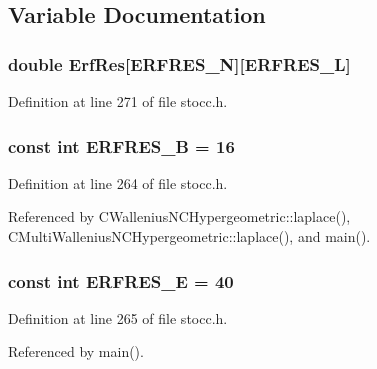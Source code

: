 \subsection{Variable Documentation}
\subsubsection[{Erf\-Res}]{\setlength{\rightskip}{0pt plus 5cm}double Erf\-Res[{\bf E\-R\-F\-R\-E\-S\-\_\-\-N}][{\bf E\-R\-F\-R\-E\-S\-\_\-\-L}]}\label{rnd_2stocc_8h_a532e3be570cd6f91d0e35bf278570579}


Definition at line 271 of file stocc.\-h.

\subsubsection[{E\-R\-F\-R\-E\-S\-\_\-\-B}]{\setlength{\rightskip}{0pt plus 5cm}const int E\-R\-F\-R\-E\-S\-\_\-\-B = 16\hspace{0.3cm}{\ttfamily [static]}}\label{rnd_2stocc_8h_aa889b5bc8e66f3c0ab1f4913b1cf084e}


Definition at line 264 of file stocc.\-h.



Referenced by C\-Wallenius\-N\-C\-Hypergeometric\-::laplace(), C\-Multi\-Wallenius\-N\-C\-Hypergeometric\-::laplace(), and main().

\subsubsection[{E\-R\-F\-R\-E\-S\-\_\-\-E}]{\setlength{\rightskip}{0pt plus 5cm}const int E\-R\-F\-R\-E\-S\-\_\-\-E = 40\hspace{0.3cm}{\ttfamily [static]}}\label{rnd_2stocc_8h_ac041927fd5715439e8ca6144832adb55}


Definition at line 265 of file stocc.\-h.



Referenced by main().

